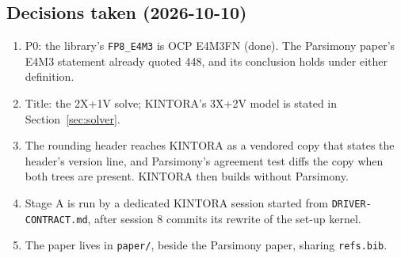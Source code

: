 \documentclass[11pt]{article}
\newcommand{\code}[1]{\texttt{#1}}
\begin{document}
\subsection{Decisions taken (2026-10-10)}

\begin{enumerate}
  \item P0: the library's \code{FP8\_E4M3} is OCP E4M3FN (done).  The Parsimony paper's E4M3
    statement already quoted 448, and its conclusion holds under either definition.
  \item Title: the 2X+1V solve; KINTORA's 3X+2V model is stated in Section~\ref{sec:solver}.
  \item The rounding header reaches KINTORA as a vendored copy that states the header's version
    line, and Parsimony's agreement test diffs the copy when both trees are present.  KINTORA then
    builds without Parsimony.
  \item Stage A is run by a dedicated KINTORA session started from \code{DRIVER-CONTRACT.md},
    after session 8 commits its rewrite of the set-up kernel.
  \item The paper lives in \code{paper/}, beside the Parsimony paper, sharing \code{refs.bib}.
\end{enumerate}
\fi
\end{document}
